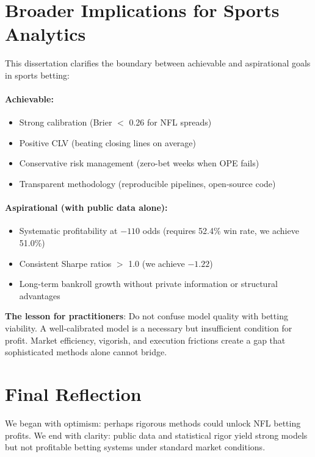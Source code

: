 \section{Broader Implications for Sports Analytics}

This dissertation clarifies the boundary between achievable and aspirational goals in sports betting:

\paragraph{Achievable:}
\begin{itemize}
  \item Strong calibration (Brier $<$ 0.26 for NFL spreads)
  \item Positive CLV (beating closing lines on average)
  \item Conservative risk management (zero-bet weeks when OPE fails)
  \item Transparent methodology (reproducible pipelines, open-source code)
\end{itemize}

\paragraph{Aspirational (with public data alone):}
\begin{itemize}
  \item Systematic profitability at $-110$ odds (requires 52.4\% win rate, we achieve 51.0\%)
  \item Consistent Sharpe ratios $>$ 1.0 (we achieve $-1.22$)
  \item Long-term bankroll growth without private information or structural advantages
\end{itemize}

\textbf{The lesson for practitioners}: Do not confuse model quality with betting viability. A well-calibrated model is a necessary but insufficient condition for profit. Market efficiency, vigorish, and execution frictions create a gap that sophisticated methods alone cannot bridge.

\section{Final Reflection}

We began with optimism: perhaps rigorous methods could unlock NFL betting profits. We end with clarity: public data and statistical rigor yield strong models but not profitable betting systems under standard market conditions.


